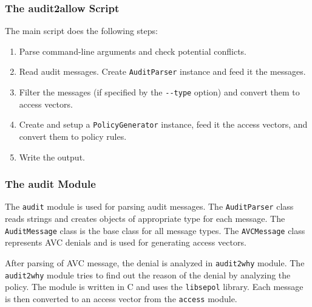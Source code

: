 \subsubsection{The audit2allow Script}

The main script does the following steps:
\begin{enumerate}
    \item Parse command-line arguments and check potential conflicts.
    \item Read audit messages. Create \texttt{AuditParser} instance and feed it
        the messages.
    \item Filter the messages (if specified by the \texttt{-{}-type} option) and
        convert them to access vectors.
    \item Create and setup a \texttt{PolicyGenerator} instance, feed it the
        access vectors, and convert them to policy rules.
    \item Write the output.
\end{enumerate}

\subsubsection{The audit Module}

The \texttt{audit} module is used for parsing audit messages. The
\texttt{AuditParser} class reads strings and creates objects of appropriate type
for each message. The \texttt{AuditMessage} class is the base class for all
message types. The \texttt{AVCMessage} class represents AVC denials and is used
for generating access vectors.

After parsing of AVC message, the denial is analyzed in \texttt{audit2why}
module. The \texttt{audit2why} module tries to find out the reason of the denial
by analyzing the policy. The module is written in C and uses the
\texttt{libsepol} library. Each message is then converted to an access vector
from the \texttt{access} module.

